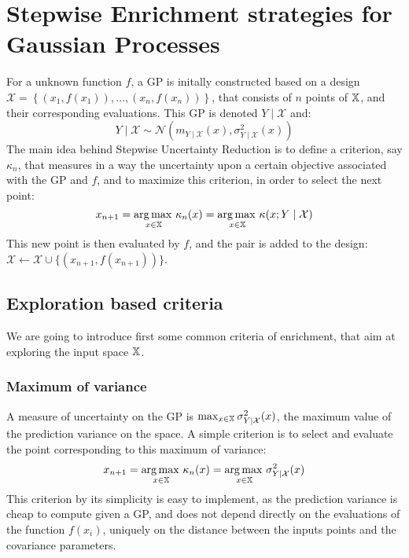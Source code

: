 \documentclass[../../Main_ManuscritThese.tex]{subfiles}
\begin{document}
\section{Stepwise Enrichment strategies for Gaussian Processes}
\label{sec:enrichment_strategies}
For a unknown function $f$, a GP is initally constructed based on a design $\mathcal{X} = \left\{\left(x_1,f(x_1)\right), \dots, \left(x_n, f(x_n)\right)\right\}$, that consists of $n$ points of $\mathbb{X}$, and their corresponding evaluations. This GP is denoted $Y \mid \mathcal{X}$ and:
\begin{equation}
  \label{eq:YgivenXGP}
  Y\mid \mathcal{X} \sim \mathcal{N}(m_{Y\mid\mathcal{X}}(x),\sigma^2_{Y\mid\mathcal{X}}(x))
\end{equation}
The main idea behind Stepwise Uncertainty Reduction is to define a criterion, say $\kappa_n$, that measures in a way the uncertainty upon a certain objective associated with the GP and $f$, and to maximize this criterion, in order to select the next point:
\begin{equation}
  x_{n+1} = \operatorname*{arg\,max \,}_{x\in\mathbb{X}} \kappa_n(x) = \operatorname*{arg\,max \,}_{x\in\mathbb{X}} \kappa(x; Y \mid \mathcal{X})
\end{equation}
This new point is then evaluated by $f$, and the pair is added to the design: $\mathcal{X} \gets \mathcal{X} \cup \{(x_{n+1}, f(x_{n+1}))\}$.
\subsection{Exploration based criteria}
\label{sec:exploration_criteria}
We are going to introduce first some common criteria of enrichment, that aim at exploring the input space $\mathbb{X}$.

\subsubsection{Maximum of variance}
A measure of uncertainty on the GP is $\max_{x\in\mathbb{X}} \sigma_{Y \mid \mathcal{X}}^2(x)$, the maximum value of the prediction variance on the space.
A simple criterion is to select and evaluate the point corresponding to this maximum of variance:
\begin{equation}
  x_{n+1} = \operatorname*{arg\,max \,}_{x\in \mathbb{X}} \kappa_n(x) = \operatorname*{arg\,max \,}_{x \in \mathbb{X}} \sigma^2_{Y \mid \mathcal{X}}(x)
\end{equation}
This criterion by its simplicity is easy to implement, as the prediction variance is cheap to compute given a GP, and does not depend directly on the evaluations of the function $f(x_i)$, uniquely on the distance between the inputs points and the covariance parameters.
\end{document}
